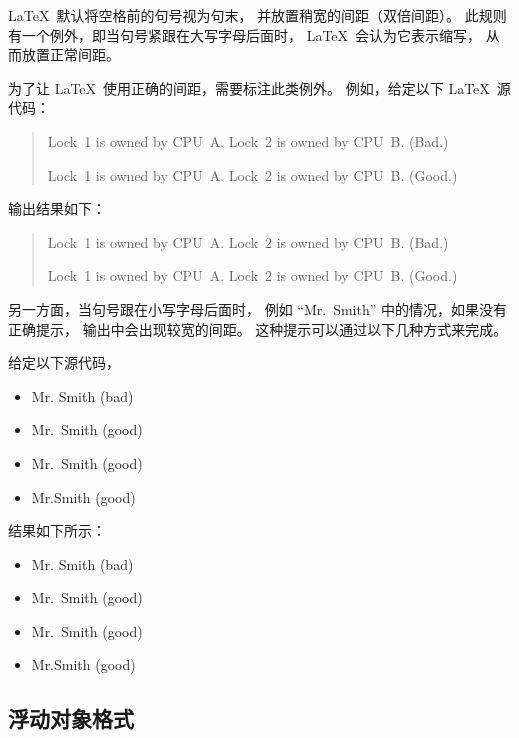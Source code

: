 \LaTeX\ 默认将空格前的句号视为句末，
并放置稍宽的间距（双倍间距）。
此规则有一个例外，即当句号紧跟在大写字母后面时，
\LaTeX\ 会认为它表示缩写，
从而放置正常间距。

为了让 \LaTeX\ 使用正确的间距，需要标注此类例外。
例如，给定以下 \LaTeX\ 源代码：

\begin{VerbatimU}
\begin{quote}
	Lock~1 is owned by CPU~A.
	Lock~2 is owned by CPU~B.  (Bad.)

	Lock~1 is owned by CPU~A\@.
	Lock~2 is owned by CPU~B\@.  (Good.)
\end{quote}
\end{VerbatimU}
%
输出结果如下：

\begin{quote}
	Lock~1 is owned by CPU~A.
	Lock~2 is owned by CPU~B.  (Bad.)

	Lock~1 is owned by CPU~A\@.
	Lock~2 is owned by CPU~B\@.  (Good.)
\end{quote}

另一方面，当句号跟在小写字母后面时，
例如 ``Mr.~Smith'' 中的情况，如果没有正确提示，
输出中会出现较宽的间距。
这种提示可以通过以下几种方式来完成。

给定以下源代码，

\begin{VerbatimU}
\begin{itemize}[nosep]
	\item Mr. Smith (bad)
	\item Mr.~Smith (good)
	\item Mr.\ Smith (good)
	\item Mr.\@ Smith (good)
\end{itemize}
\end{VerbatimU}

\noindent%
结果如下所示：

\begin{itemize}[nosep]
	\item Mr. Smith (bad)
	\item Mr.~Smith (good)
	\item Mr.\ Smith (good)
	\item Mr.\@ Smith (good)
\end{itemize}

\subsection{浮动对象格式}
\label{sec:app:styleguide:Floating Object Format}

